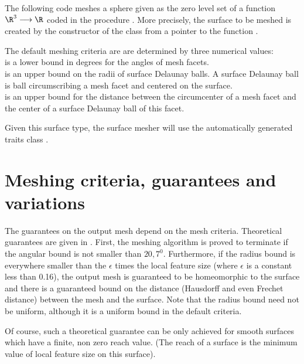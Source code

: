The following code meshes a sphere 
given as the zero level set of a function $\R^3 \longrightarrow \R$
coded in the procedure .
More precisely, 
the surface to be meshed is created 
by the constructor
of the class 
from a pointer to the function .

The default meshing criteria are  are determined  by three numerical
values: \\ 
 is a lower bound in degrees for the angles 
     of mesh facets.\\
 is an upper bound on the radii of surface Delaunay
balls. A surface Delaunay ball is ball circumscribing a mesh facet
and centered on the surface. \\
 is an upper bound for the distance 
between the circumcenter of a mesh facet and the center of a surface
Delaunay ball of this facet.

Given this surface type, the surface mesher will use
the automatically generated traits class
.


\section{Meshing criteria, guarantees and variations}
\label{SurfaceMesher_section_criteria}
\label{SurfaceMesher_section_variations}

The guarantees on the output mesh depend on the mesh criteria.
Theoretical guarantees are given in \cite{cgal:sry-mvbss-05}.
First, the meshing algorithm is proved to terminate 
if the angular bound is
not smaller than $20,7^0$. 
Furthermore, if the radius bound is everywhere smaller than 
the $\epsilon$ times the local feature size  
(where $\epsilon$ is a constant
less than 0.16),  the output mesh 
is guaranteed to be homeomorphic to the surface
and  there is a guaranteed bound 
on the  distance (Hausdorff and even Frechet distance)
between the mesh and the surface.
Note that the radius bound need not be uniform,
although it is a uniform bound in the default criteria.

Of course, such a theoretical guarantee can be only achieved
for smooth surfaces which have a finite, non zero
reach value. (The reach of a surface is the minimum value 
of local feature size on
this surface).

